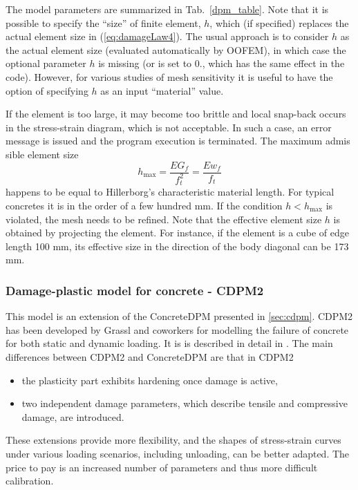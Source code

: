 \documentclass[a4paper]{article}
\begin{document}
The model parameters are summarized
in Tab.~\ref{dpm_table}. Note that it is possible to specify the ``size'' of finite element, $h$, which (if specified) replaces
the actual element size in  (\ref{eq:damageLaw4}). The usual approach is to consider $h$ as the actual element size (evaluated automatically by OOFEM), 
in which case the optional
parameter $h$ is missing (or is set to 0., which has the same effect in the code). However, for various studies of mesh sensitivity
it is useful to have the option of  specifying $h$ as an input ``material'' value.

If the element is too large, it may become too brittle and local snap-back
occurs in the stress-strain diagram, which is not acceptable. 
In such a case, an error message is issued and the program execution
is terminated. The maximum admis
sible element size 
\begin{equation}
h_{\max} = \frac{EG_f}{f_t^2} = \frac{Ew_f}{f_t}
\end{equation}
happens to be equal to Hillerborg's characteristic material length. 
For typical concretes it is in the order of a few hundred mm. 
If the condition $h<h_{\max}$ is violated, the mesh needs to be refined.
Note that the effective element size $h$ is obtained by projecting the element.
For instance, if the element is a cube of edge length 100 mm, its effective
size in the direction of the body diagonal can be 173 mm. 

\subsubsection{Damage-plastic model for concrete - CDPM2}

This model is an extension of the ConcreteDPM presented in \ref{sec:cdpm}.
CDPM2 has been developed by Grassl and coworkers for modelling the failure of concrete for both static and dynamic loading. It is is described in detail in \cite{GraXenNys13}.
The main differences between CDPM2 and ConcreteDPM are that in CDPM2
\begin{itemize}
\item the plasticity part exhibits hardening once damage is active,
\item two independent damage parameters, which describe tensile and compressive damage, are introduced.
\end{itemize}
These extensions provide more flexibility, and the shapes
of stress-strain curves under various loading scenarios, including unloading, can be better adapted. The price to pay
is an increased number of parameters and thus more difficult calibration.
\end{document}
